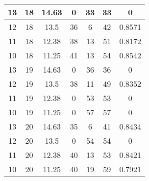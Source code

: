 \documentclass[letterpaper, 12pt]{article}
\begin{document}
\begin{longtable}{|c|c|c|c|c|c|c|}
\hline
13 & 18 & 14.63 & 0 & 33 & 33 & 0 \\
\hline
12 & 18 & 13.5 & 36 & 6 & 42 & 0.8571 \\
\hline
11 & 18 & 12.38 & 38 & 13 & 51 & 0.8172 \\
\hline
10 & 18 & 11.25 & 41 & 13 & 54 & 0.8542 \\
\hline
13 & 19 & 14.63 & 0 & 36 & 36 & 0 \\
\hline
12 & 19 & 13.5 & 38 & 11 & 49 & 0.8352 \\
\hline
11 & 19 & 12.38 & 0 & 53 & 53 & 0 \\
\hline
10 & 19 & 11.25 & 0 & 57 & 57 & 0 \\
\hline
13 & 20 & 14.63 & 35 & 6 & 41 & 0.8434 \\
\hline
12 & 20 & 13.5 & 0 & 54 & 54 & 0 \\
\hline
11 & 20 & 12.38 & 40 & 13 & 53 & 0.8421 \\
\hline
10 & 20 & 11.25 & 40 & 19 & 59 & 0.7921 \\
\hline
\end{longtable}
\end{document}
